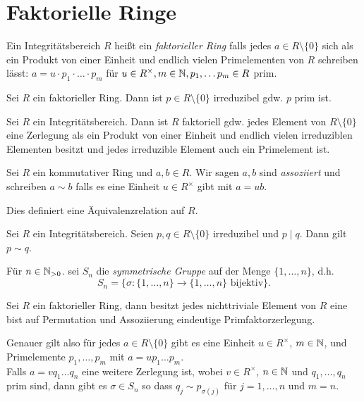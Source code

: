 \section{Faktorielle Ringe}

\begin{definition}
	Ein Integritätsbereich $R$ heißt ein \emph{faktorieller Ring} falls jedes $a \in R \setminus \{0\}$ sich als ein Produkt von einer Einheit
	und endlich vielen Primelementen von $R$ schreiben lässt: $a = u \cdot  p_1 \cdot \ldots \cdot p_{m}$ für $u \in R^{\times}, m \in \mathbb{N}, p_1,\ldots p_{m} \in R$ prim.
\end{definition}


\begin{proposition}
	Sei $R$ ein faktorieller Ring.
	Dann ist $p \in R \setminus \{0\} $ irreduzibel gdw. $p$ prim ist.
\end{proposition}


\begin{corollary}
	Sei $R$ ein Integritätsbereich. Dann ist $R$ faktoriell gdw. jedes Element von $R \setminus \{0\} $ eine Zerlegung als ein Produkt
	von einer Einheit und endlich vielen irreduziblen Elementen besitzt und jedes irreduzible Element auch ein Primelement ist.
\end{corollary}

\begin{definition}
	Sei $R$ ein kommutativer Ring und $a,b \in R$.
	Wir sagen $a,b$ sind \emph{assoziiert} und schreiben $a \sim b$ falls es eine Einheit
	$u \in R^{\times}$ gibt mit $a = u b$.
\end{definition}

\begin{lemma}
	Dies definiert eine Äquivalenzrelation auf $R$.
\end{lemma}


\begin{lemma}
	Sei $R$ ein Integritätsbereich. Seien $p,q \in R \setminus \{0\} $ irreduzibel und $p \mid q$.
	Dann gilt $p \sim q$.
\end{lemma}


\begin{definition}[Wh.]
	Für $n \in \mathbb{N}_{> 0}$. sei $S_{n}$ die \emph{symmetrische Gruppe} auf der Menge $\{1,\ldots,n\}$, d.h.
	\[
	S_{n} = \{ \sigma: \{1,\ldots, n\} \to \{1,\ldots,n\} \text{ bijektiv}\} 
	.\] 
\end{definition}

\begin{theorem}
	Sei $R$ ein faktorieller Ring, dann besitzt jedes nichttriviale Element von $R$ eine bist auf Permutation und Assoziierung 
	eindeutige Primfaktorzerlegung.

	Genauer gilt also für jedes $a \in R \setminus \{0\} $ gibt es eine Einheit $u \in R^{\times}$, $m \in \mathbb{N}$, und
	Primelemente $p_1,\ldots,p_{m}$ mit $a = u p_1 \ldots p_{m}$.\\
	Falls $a = v q_1 \ldots q_{n}$ eine weitere Zerlegung ist, wobei $v \in R^{\times}$, $n \in \mathbb{N}$ und $q_1,\ldots,q_{n}$ prim sind,
	dann gibt es $\sigma \in S_{n}$ so dass $q_{j} \sim p_{\sigma(j)}$ für $j = 1,\ldots,n$ und $m = n$.
\end{theorem}

